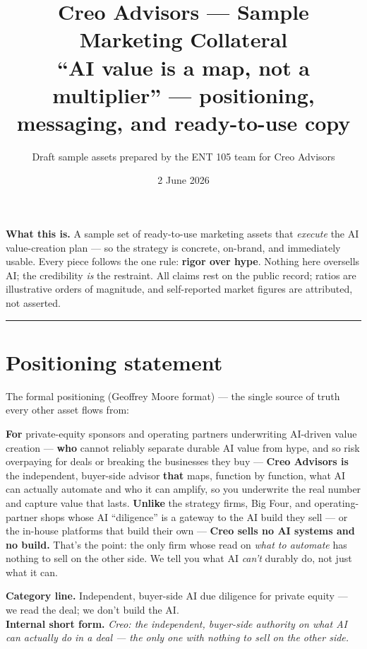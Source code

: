 \documentclass[11pt]{article}
\title{\textbf{\color{creonavy} Creo Advisors --- Sample Marketing Collateral}\\[3pt]
\large ``AI value is a map, not a multiplier'' --- positioning, messaging, and ready-to-use copy}
\author{\normalsize Draft sample assets prepared by the ENT 105 team for Creo Advisors}
\date{\normalsize 2 June 2026}
\begin{document}
\maketitle
\vspace{-1.2em}

\begin{bigidea}
\textbf{What this is.} A sample set of ready-to-use marketing assets that \emph{execute} the AI
value-creation plan --- so the strategy is concrete, on-brand, and immediately usable. Every
piece follows the one rule: \textbf{rigor over hype}. Nothing here oversells AI; the credibility
\emph{is} the restraint. All claims rest on the public record; ratios are illustrative orders of
magnitude, and self-reported market figures are attributed, not asserted.
\end{bigidea}

\tableofcontents
\vspace{0.5em}\hrule\vspace{0.7em}

\section{Positioning statement}
The formal positioning (Geoffrey Moore format) --- the single source of truth every other asset
flows from:

\begin{callout}
\textbf{For} private-equity sponsors and operating partners underwriting AI-driven value creation
--- \textbf{who} cannot reliably separate durable AI value from hype, and so risk overpaying for
deals or breaking the businesses they buy --- \textbf{Creo Advisors is} the independent, buyer-side
advisor \textbf{that} maps, function by function, what AI can actually automate and who it can
amplify, so you underwrite the real number and capture value that lasts. \textbf{Unlike} the
strategy firms, Big Four, and operating-partner shops whose AI ``diligence'' is a gateway to the AI
build they sell --- or the in-house platforms that build their own --- \textbf{Creo sells no AI
systems and no build.} That's the point: the only firm whose read on \emph{what to automate} has
nothing to sell on the other side. We tell you what AI \emph{can't} durably do, not just what it can.
\end{callout}

\textbf{Category line.} Independent, buyer-side AI due diligence for private equity --- we read the
deal; we don't build the AI.\\
\textbf{Internal short form.} \emph{Creo: the independent, buyer-side authority on what AI can
actually do in a deal --- the only one with nothing to sell on the other side.}
\end{document}

